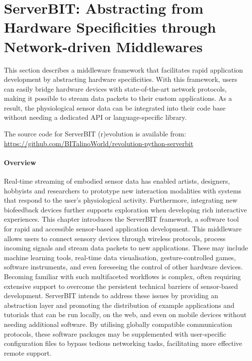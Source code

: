 \section{ServerBIT: Abstracting from Hardware Specificities through Network-driven Middlewares}

This section describes a middleware framework that facilitates rapid application development by abstracting hardware specificities. With this framework, users can easily bridge hardware devices with state-of-the-art network protocols, making it possible to stream data packets to their custom applications. As a result, the physiological sensor data can be integrated into their code base without needing a dedicated API or language-specific library.

The source code for ServerBIT (r)evolution is available from:
\url{https://github.com/BITalinoWorld/revolution-python-serverbit}

\paragraph{Overview}

Real-time streaming of embodied sensor data has enabled artists, designers, hobbyists and researchers to prototype new interaction modalities with systems that respond to the user’s physiological activity. Furthermore, integrating new biofeedback devices further supports exploration when developing rich interactive experiences. This chapter introduces the ServerBIT framework, a software tool for rapid and accessible sensor-based application development. This middleware allows users to connect sensory devices through wireless protocols, process incoming signals and stream data packets to new applications. These may include machine learning tools, real-time data visualisation, gesture-controlled games, software instruments, and even foreseeing the control of other hardware devices. Becoming familiar with such multifaceted workflows is complex, often requiring extensive support to overcome the persistent technical barriers of sensor-based development. ServerBIT intends to address these issues by providing an abstraction layer and promoting the distribution of example applications and tutorials that can be run locally, on the web, and even on mobile devices without needing additional software. By utilising globally compatible communication protocols, these software packages may be supplemented with user-specific configuration files to bypass tedious networking tasks, facilitating more effective remote support.

